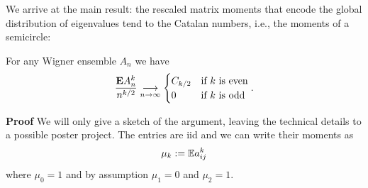 We arrive at the main result: the rescaled matrix moments that encode the global distribution of eigenvalues tend to the Catalan numbers, i.e., the moments of a semicircle:

\begin{theorem} For any Wigner ensemble $A_n$ we have
\[
  {\ensuremath{\bm{\mathrm{E}}} A_n^k \over n^{k/2}} \underset{n \ensuremath{\rightarrow} \ensuremath{\infty}}{\ensuremath{\longrightarrow}} \begin{cases}
    C_{k/2} & \hbox{\textrm{if $k$ is even}} \\
    0 & \hbox{\textrm{if $k$ is odd}}
  \end{cases}.
\]
\end{theorem}
\textbf{Proof} We will only give a sketch of the argument, leaving the technical details to a possible poster project. The entries  are iid and we can write their moments as
\[
\mu_k := {\mathbb E} a_{ij}^k
\]
where $\ensuremath{\mu}_0 = 1$ and by assumption $\ensuremath{\mu}_1 = 0$ and $\ensuremath{\mu}_2 = 1$.

